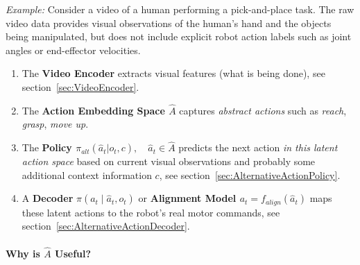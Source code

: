 \textit{Example:} 
Consider a video of a human performing a pick-and-place task. The raw video data provides visual observations of the human's hand and the objects being manipulated, but does not include explicit robot action labels such as joint angles or end-effector velocities.
\begin{enumerate}
    \item The \textbf{Video Encoder} extracts visual features (what is being done), see section~\ref{sec:VideoEncoder}.
    \item The \textbf{Action Embedding Space $\hat{A}$} captures \textit{abstract actions} such as \textit{reach}, \textit{grasp}, \textit{move up}.
    \item The \textbf{Policy $\pi_{alt}( \hat{a}_t | o_t, c), \quad \hat{a}_t \in \hat{A}$} predicts the next action \textit{in this latent action space} based on current visual observations and probably some additional context information $c$, see section~\ref{sec:AlternativeActionPolicy}.  
    \item A \textbf{Decoder} $\pi(a_t \mid \hat{a}_t, o_t)$ or \textbf{Alignment Model $a_t = f_{align}(\hat{a}_t)$} maps these latent actions to the robot's real motor commands, see section~\ref{sec:AlternativeActionDecoder}.    
\end{enumerate}



\paragraph{Why is $\hat{A}$ Useful?}

